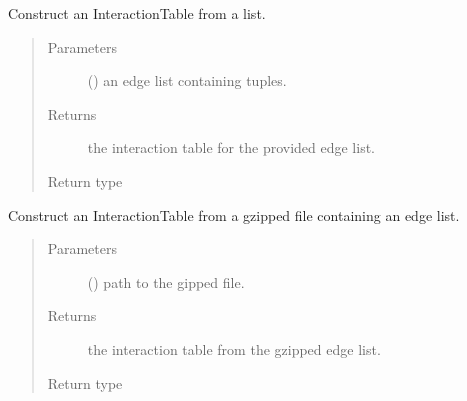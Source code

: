 \documentclass[letterpaper,10pt,english]{sphinxmanual}
\begin{document}
\begin{fulllineitems}
\label{\detokenize{_modules/cosifer.collections:cosifer.collections.interaction_table.interaction_table_from_edge_list}}
Construct an InteractionTable from a list.
\begin{quote}\begin{description}
\item[{Parameters}] \leavevmode
{} () \textendash{} an edge list containing tuples.

\item[{Returns}] \leavevmode
the interaction table for the provided edge list.

\item[{Return type}] \leavevmode
{\hyperref[\detokenize{_modules/cosifer.collections:cosifer.collections.interaction_table.InteractionTable}]{}}

\end{description}\end{quote}

\end{fulllineitems}


\begin{fulllineitems}
\label{\detokenize{_modules/cosifer.collections:cosifer.collections.interaction_table.interaction_table_from_gzip}}
Construct an InteractionTable from a gzipped file containing an edge list.
\begin{quote}\begin{description}
\item[{Parameters}] \leavevmode
{} () \textendash{} path to the gipped file.

\item[{Returns}] \leavevmode
the interaction table from the gzipped edge list.

\item[{Return type}] \leavevmode
{\hyperref[\detokenize{_modules/cosifer.collections:cosifer.collections.interaction_table.InteractionTable}]{}}

\end{description}\end{quote}

\end{fulllineitems}
\end{document}
